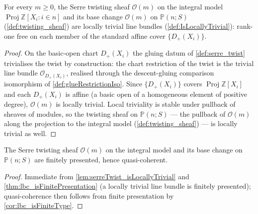 \begin{lemma}
  \label{lem:serreTwist_isLocallyTrivial}
  For every \(m \ge 0\), the Serre twisting sheaf \(\mathcal{O}(m)\) on
  the integral model \(\operatorname{Proj} \mathbb{Z}[X_i : i \in n]\)
  and its base change \(\mathcal{O}(m)\) on \(\mathbb{P}(n; S)\)
  (\cref{def:twisting_sheaf}) are locally trivial line bundles
  (\cref{def:IsLocallyTrivial}): rank-one free on each member of the
  standard affine cover \(\{D_+(X_i)\}\).
\end{lemma}
\begin{proof}\leanok
  On the basic-open chart \(D_+(X_i)\) the gluing datum of
  \cref{def:serre_twist} trivialises the twist by construction: the
  chart restriction of the twist is the trivial line bundle
  \(\mathcal{O}_{D_+(X_i)}\), realised through the descent-gluing
  comparison isomorphism of \cref{def:glueRestrictionIso}. Since
  \(\{D_+(X_i)\}\) covers \(\operatorname{Proj} \mathbb{Z}[X_i]\) and
  each \(D_+(X_i)\) is affine (a basic open of a homogeneous element of
  positive degree), \(\mathcal{O}(m)\) is locally trivial. Local
  triviality is stable under pullback of sheaves of modules, so the
  twisting sheaf on \(\mathbb{P}(n; S)\) --- the pullback of
  \(\mathcal{O}(m)\) along the projection to the integral model
  (\cref{def:twisting_sheaf}) --- is locally trivial as well.
\end{proof}

\begin{corollary}
  \label{cor:serreTwist_isFinitePresentation}
  The Serre twisting sheaf \(\mathcal{O}(m)\) on the integral model and
  its base change on \(\mathbb{P}(n; S)\) are finitely presented, hence
  quasi-coherent.
\end{corollary}
\begin{proof}\leanok
  Immediate from \cref{lem:serreTwist_isLocallyTrivial} and
  \cref{thm:lbc_isFinitePresentation} (a locally trivial line bundle is
  finitely presented); quasi-coherence then follows from finite
  presentation by \cref{cor:lbc_isFiniteType}.
\end{proof}

